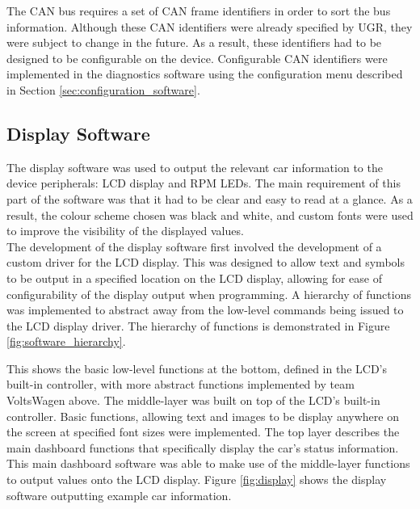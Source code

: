 \documentclass[a4paper,12pt]{article}
\begin{document}
The CAN bus requires a set of CAN frame identifiers in order to sort the bus information. Although these CAN identifiers were already specified by UGR, they were subject to change in the future. As a result, these identifiers had to be designed to be configurable on the device. Configurable CAN identifiers were implemented in the diagnostics software using the configuration menu described in Section \ref{sec:configuration_software}.

\subsection{Display Software}
\label{sec:display_software}

The display software was used to output the relevant car information to the device peripherals: LCD display and RPM LEDs. The main requirement of this part of the software was that it had to be clear and easy to read at a glance. As a result, the colour scheme chosen was black and white, and custom fonts were used to improve the visibility of the displayed values. \\

The development of the display software first involved the development of a custom driver for the LCD display. This was designed to allow text and symbols to be output in a specified location on the LCD display, allowing for ease of configurability of the display output when programming. A hierarchy of functions was implemented to abstract away from the low-level commands being issued to the LCD display driver. The hierarchy of functions is demonstrated in Figure \ref{fig:software_hierarchy}. 



This shows the basic low-level functions at the bottom, defined in the LCD's built-in controller, with more abstract functions implemented by team VoltsWagen above. The middle-layer was built on top of the LCD's built-in controller. Basic functions, allowing text and images to be display anywhere on the screen at specified font sizes were implemented. The top layer describes the main dashboard functions that specifically display the car's status information. This main dashboard software was able to make use of the middle-layer functions to output values onto the LCD display. Figure \ref{fig:display} shows the display software outputting example car information. \\


\end{document}
